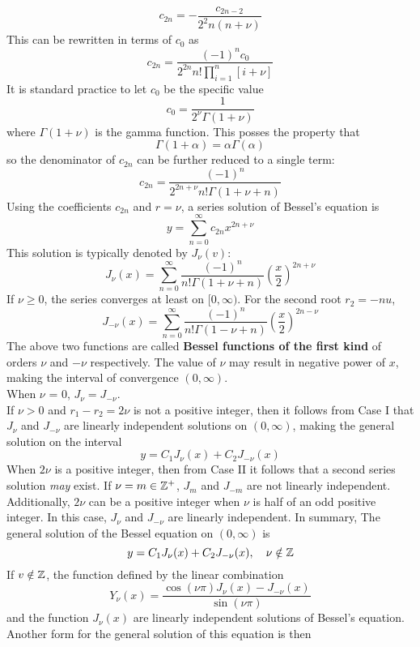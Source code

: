 \documentclass[./Differential Equations.tex]{subfiles}
\begin{document}
				\[c_{2n} = -\frac{c_{2n - 2}}{2^2n(n + \nu)}\]
				This can be rewritten in terms of \(c_0\) as
				\[c_{2n} = \frac{(-1)^nc_0}{2^{2n}n!\prod\limits_{i = 1}^n\left[i + \nu\right]}\]
				It is standard practice to let \(c_0\) be the specific value
				\[c_0 = \frac{1}{2^\nu\Gamma(1 + \nu)}\]
				where \(\Gamma(1 + \nu)\) is the gamma function. This posses the property that
				\[\Gamma(1 + \alpha) = \alpha\Gamma(\alpha)\]
				so the denominator of \(c_{2n}\) can be further reduced to a single term:
				\[c_{2n}= \frac{(-1)^n}{2^{2n + \nu}n!\Gamma(1 + \nu + n)}\]
			Using the coefficients \(c_{2n}\) and \(r = \nu\), a series solution of Bessel's equation is
				\[y = \sum_{n = 0}^\infty c_{2n}x^{2n + \nu}\]
				This solution is typically denoted by \(J_\nu(v)\):
				\[J_\nu(x) = \sum_{n = 0}^\infty \frac{(-1)^n}{n!\Gamma(1 + \nu + n)}\left(\frac{x}{2}\right)^{2n + \nu}\]
				If \(\nu \ge 0\), the series converges at least on \([0, \infty)\). For the second root \(r_2 = -nu\),
				\[J_{-\nu}(x) = \sum_{n = 0}^\infty \frac{(-1)^n}{n!\Gamma(1 - \nu + n)}\left(\frac{x}{2}\right)^{2n - \nu}\]
				The above two functions are called \textbf{Bessel functions of the first kind} of orders \(\nu\) and \(-\nu\) respectively. The value of \(\nu\) may result in negative power of \(x\), making the interval of convergence \((0, \infty)\). \\
				When \(\nu\) = 0, \(J_\nu = J_{-\nu}\). \\
				If \(\nu > 0\) and \(r_1 - r_2 = 2\nu\) is not a positive integer, then it follows from Case I that \(J_\nu\) and \(J_{-\nu}\) are linearly independent solutions on \((0, \infty)\), making the general solution on the interval
				\[y = C_1J_\nu(x) + C_2J_{-\nu}(x)\]
				When \(2\nu\) is a positive integer, then from Case II it follows that a second series solution \textit{may} exist. If \(\nu = m \in \mathbb{Z}^+\), \(J_m\) and \(J_{-m}\) are not linearly independent. Additionally, \(2\nu\) can be a positive integer when \(\nu\) is half of an odd positive integer. In this case, \(J_\nu\) and \(J_{-\nu}\) are linearly independent. In summary, The general solution of the Bessel equation on \((0, \infty)\) is
				\[y = C_1J_\nu(x) + C_2J_{-\nu}(x), \quad \nu \notin \mathbb{Z}\]
			If \(v \notin \mathbb{Z}\), the function defined by the linear combination
				\[Y_\nu(x) = \frac{\cos(\nu\pi)J_\nu(x) - J_{-\nu}(x)}{\sin(\nu\pi)}\]
				and the function \(J_\nu(x)\) are linearly independent solutions of Bessel's equation. Another form for the general solution of this equation is then
\end{document}
